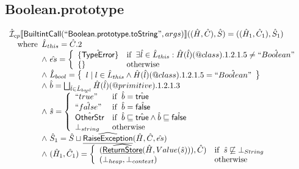 \subsection{Boolean.prototype}
\[
\begin{array}{l}
\hat{\mathcal{I}} _{cp}\llbracket \mbox{\textsf{BuiltintCall}}(``\mbox{\textsf{Boolean.prototype.toString}}",args)\rrbracket((\hat{H},\hat{C}), \hat{S})
  = ((\hat{H}_1, \hat{C}_1), \hat{S}_1)\\
\quad{\rm where}\begin{array}[t]{l}
  \hat{L}_{this} = \hat{C}.2\\
  \land\ \hat{es} = \left\{\begin{array}{ll}
      \{\hat{\mbox{\textsf{TypeError}}}\} 
      & {\rm if}\begin{array}[t]{l}\exists \hat{l} \in \hat{L}_{this}:
          \hat{H}(\hat{l})(@class).1.2.1.5 \neq \hat{``Boolean"}\end{array}\\
      \left\{\begin{array}{l}\end{array}\right\} & {\rm otherwise}
    \end{array}\right.\\
  \land\ \hat{L}_{bool} = 
    \left\{\begin{array}{l} l \mid l \in \hat{L}_{this} \land  \hat{H}(\hat{l})(@class).1.2.1.5 = \hat{``Boolean"}\end{array}\right\}\\
  \land\ \hat{b} = \bigsqcup_{\hat{l} \in \hat{L}_{bool}} \hat{H}(\hat{l})(@primitive).1.2.1.3\\
  \land\ \hat{s} = \left\{\begin{array}{ll}
      \hat{``true"} & {\rm if}\begin{array}[t]{l}\hat{b} = \hat{\mbox{\textsf{true}}}\end{array}\\
      \hat{``false"} & {\rm if}\begin{array}[t]{l}\hat{b} = \hat{\mbox{\textsf{false}}}\end{array}\\
      \hat{\mbox{\textsf{OtherStr}}} & {\rm if}\begin{array}[t]{l}\hat{b} \sqsubseteq \hat{\mbox{\textsf{true}}} \land \hat{b} \sqsubseteq \hat{\mbox{\textsf{false}}}\end{array}\\
      \bot_{string} & {\rm otherwise}
    \end{array}\right.\\
  \land\ \hat{S}_1 = \hat{S} \sqcup \widehat{\underline{\sf RaiseException}}(\hat{H}, \hat{C}, \hat{es})\\
  \land\ (\hat{H}_1, \hat{C}_1) = 
    \left\{\begin{array}{ll}
      (\widehat{\underline{\sf ReturnStore}}(\hat{H}, Value(\hat{s}))), \hat{C})
      & {\rm if}\begin{array}[t]{l}\hat{s} \not\sqsubseteq \bot_{String}\end{array}\\
      (\bot_{heap}, \bot_{context}) & {\rm otherwise} \\
    \end{array}\right.
  \end{array}\\
\\\\



\end{array}\]
